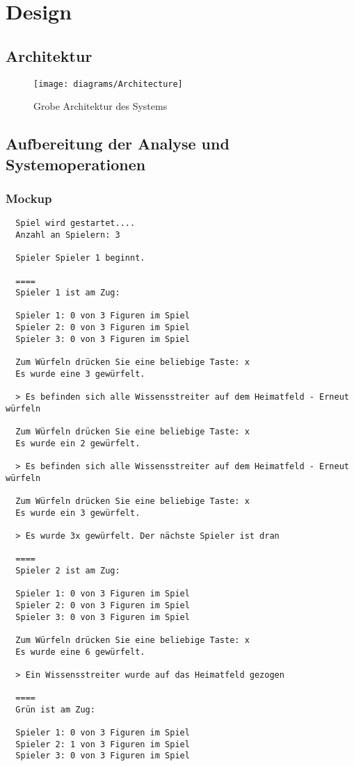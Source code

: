 \chapter{Design}\label{chap:Design}

\section{Architektur}
\begin{figure}[h]
  \begin{center}
    \texttt{[image: diagrams/Architecture]}
    \caption{Grobe Architektur des Systems}
  \end{center}
\end{figure}
\newpage

\section{Aufbereitung der Analyse und Systemoperationen}

\subsection{Mockup}
\begin{verbatim}
  Spiel wird gestartet....
  Anzahl an Spielern: 3

  Spieler Spieler 1 beginnt.

  ====
  Spieler 1 ist am Zug:

  Spieler 1: 0 von 3 Figuren im Spiel
  Spieler 2: 0 von 3 Figuren im Spiel
  Spieler 3: 0 von 3 Figuren im Spiel

  Zum Würfeln drücken Sie eine beliebige Taste: x
  Es wurde eine 3 gewürfelt.

  > Es befinden sich alle Wissensstreiter auf dem Heimatfeld - Erneut würfeln

  Zum Würfeln drücken Sie eine beliebige Taste: x
  Es wurde ein 2 gewürfelt.

  > Es befinden sich alle Wissensstreiter auf dem Heimatfeld - Erneut würfeln

  Zum Würfeln drücken Sie eine beliebige Taste: x
  Es wurde ein 3 gewürfelt.

  > Es wurde 3x gewürfelt. Der nächste Spieler ist dran

  ====
  Spieler 2 ist am Zug:

  Spieler 1: 0 von 3 Figuren im Spiel
  Spieler 2: 0 von 3 Figuren im Spiel
  Spieler 3: 0 von 3 Figuren im Spiel

  Zum Würfeln drücken Sie eine beliebige Taste: x
  Es wurde eine 6 gewürfelt.

  > Ein Wissensstreiter wurde auf das Heimatfeld gezogen

  ====
  Grün ist am Zug:

  Spieler 1: 0 von 3 Figuren im Spiel
  Spieler 2: 1 von 3 Figuren im Spiel
  Spieler 3: 0 von 3 Figuren im Spiel
\end{verbatim}

